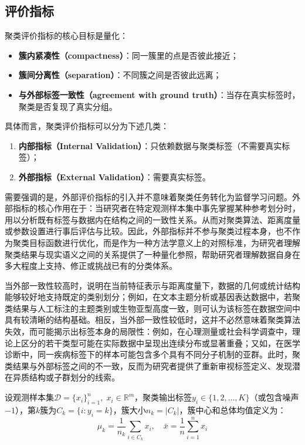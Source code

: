 \subsection{评价指标}
聚类评价指标的核心目标是量化：
\begin{itemize}
	\item \textbf{簇内紧凑性（compactness）}：同一簇里的点是否彼此接近；
	\item \textbf{簇间分离性（separation）}：不同簇之间是否彼此远离；
	\item \textbf{与外部标签一致性（agreement with ground truth）}：当存在真实标签时，聚类是否复现了真实分组。
\end{itemize}
具体而言，聚类评价指标可以分为下述几类：
\begin{enumerate}
	\item \textbf{内部指标（Internal Validation）}：只依赖数据与聚类标签（不需要真实标签）；
	\item \textbf{外部指标（External Validation）}：需要真实标签。
\end{enumerate}\par
需要强调的是，外部评价指标的引入并不意味着聚类任务转化为监督学习问题。外部指标的核心作用在于：当研究者在特定观测样本集中事先掌握某种参考划分时，用以分析既有标签与数据内在结构之间的一致性关系。从而对聚类算法、距离度量或参数设置进行事后评估与比较。因此，外部指标并不参与聚类过程本身，也不作为聚类目标函数进行优化，而是作为一种方法学意义上的对照标准，为研究者理解聚类结果与现实语义之间的关系提供了一种量化参照，帮助研究者理解数据自身在多大程度上支持、修正或挑战已有的分类体系。\par
当外部一致性较高时，说明在当前特征表示与距离度量下，数据的几何或统计结构能够较好地支持既定的类别划分；例如，在文本主题分析或基因表达数据中，若聚类结果与人工标注的主题类别或生物亚型高度一致，则可认为该标签在数据空间中具有较清晰的结构基础。相反，当外部一致性较低时，这并不必然意味着聚类算法失效，而可能揭示出标签本身的局限性：例如，在心理测量或社会科学调查中，理论上区分的若干类型可能在实际数据中呈现出连续分布或显著重叠；又如，在医学诊断中，同一疾病标签下的样本可能包含多个具有不同分子机制的亚群。此时，聚类结果与外部标签之间的不一致，反而为研究者提供了重新审视标签定义、发现潜在异质结构或子群划分的线索。\par
设观测样本集$\mathcal{D}=\{x_i\}_{i=1}^n,\;x_i\in\mathbb{R}^m$，聚类输出标签$y_i\in\{1,2,\dots,K\}$（或包含噪声$-1$），第$k$簇为$C_k=\{i:y_i=k\}$，簇大小$n_k=|C_k|$，簇中心和总体均值定义为：
\begin{equation*}
	\mu_k=\frac{1}{n_k}\sum_{i\in C_k}x_i,\quad\bar{x}=\frac{1}{n}\sum_{i=1}^nx_i
\end{equation*}
